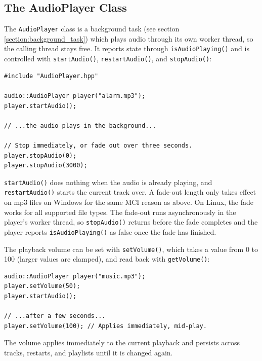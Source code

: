 \subsection{The AudioPlayer Class}\label{section:audio_player}

The \texttt{AudioPlayer} class is a background task (see section \ref{section:background_task}) which plays audio through its own worker thread, so the calling thread stays free. It reports state through \texttt{isAudioPlaying()} and is controlled with \texttt{startAudio()}, \texttt{restartAudio()}, and \texttt{stopAudio()}:
\begin{lstlisting}[style=cppstyle]
#include "AudioPlayer.hpp"

audio::AudioPlayer player("alarm.mp3");
player.startAudio();

// ...the audio plays in the background...

// Stop immediately, or fade out over three seconds.
player.stopAudio(0);
player.stopAudio(3000);
\end{lstlisting}
\texttt{startAudio()} does nothing when the audio is already playing, and \texttt{restartAudio()} starts the current track over. A fade-out length only takes effect on mp3 files on Windows for the same MCI reason as above. On Linux, the fade works for all supported file types. The fade-out runs asynchronously in the player's worker thread, so \texttt{stopAudio()} returns before the fade completes and the player reports \texttt{isAudioPlaying()} as false once the fade has finished.

The playback volume can be set with \texttt{setVolume()}, which takes a value from 0 to 100 (larger values are clamped), and read back with \texttt{getVolume()}:
\begin{lstlisting}[style=cppstyle]
audio::AudioPlayer player("music.mp3");
player.setVolume(50);
player.startAudio();

// ...after a few seconds...
player.setVolume(100); // Applies immediately, mid-play.
\end{lstlisting}
The volume applies immediately to the current playback and persists across tracks, restarts, and playlists until it is changed again.

